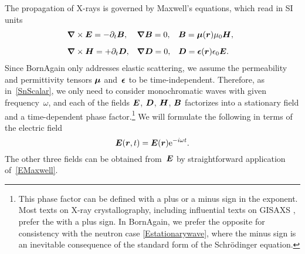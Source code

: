 The propagation of X-rays is governed by Maxwell's equations,
which read in SI units
%
\begin{equation}\label{EMaxwell}
  \begin{array}{@{}l@{\quad}l@{\quad}l}
    \Nabla\times\v{E}=-\partial_t \v{B},
   &\Nabla\v{B}=0,
   &\v{B}=\v{\mu}(\r)\mu_0\v{H},
   \\[2ex]
    \Nabla\times\v{H}=+\partial_t \v{D},
   &\Nabla\v{D}=0,
   &\v{D}=\v{\eps}(\r)\eps_0\v{E}.
  \end{array}
\end{equation}
%
%
%
%
%
%
%
%
Since BornAgain only addresses elastic scattering,
%
%
we assume the permeability and permittivity tensors $\bm{\mu}$ and~$\bm{\epsilon}$
to be time-independent.
%
Therefore, as in~\cref{SnScalar}, we only need to consider monochromatic waves
%
%
with given frequency~$\omega$,
and each of the fields $\bm{E}$, $\bm{D}$, $\bm{H}$, $\bm{B}$
factorizes into a stationary field and a time-dependent phase factor.\footnote
{This phase factor can be defined with a plus or a minus sign in the exponent.
Most texts on X-ray crystallography,
including influential texts on GISAXS \cite{ReLL09},
prefer the  with a plus sign.
%
%
%
%
In BornAgain, we prefer the opposite 
%
for consistency with the neutron case \cref{Estationarywave},
where the minus sign is an inevitable consequence
of the standard form of the Schrödinger equation.%
%
}
%
We will formulate the following in terms of the electric field
%
\begin{equation}\label{EstationaryX}
  \bm{E}(\bm{r},t) = \bm{E}(\bm{r})\mathrm e^{-i\omega t}.
\end{equation}
The other three fields can be obtained from~$\bm{E}$
by straightforward application of~\cref{EMaxwell}.

